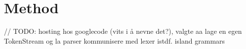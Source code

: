 \chapter{Method}



// TODO: 
hosting hos googlecode (vits i å nevne det?), valgte aa lage en egen TokenStream og
la parser kommunisere med lexer istdf. island grammars